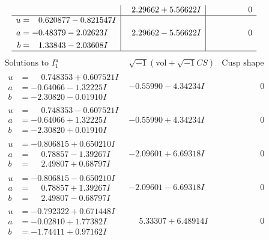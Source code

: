 \documentclass[1p]{elsarticle_modified}
\theoremstyle{definition}
\newcommand{\I}{\sqrt{-1}}
\begin{document}
$$\begin{array}{c|c|c}
 & \phantom{-}2.29662 + 5.56622 I & \phantom{-0.000000 } 0 \\ \hline\begin{aligned}
u &= \phantom{-}0.620877 - 0.821547 I \\
a &= -0.48379 - 2.02623 I \\
b &= \phantom{-}1.33843 - 2.03608 I\end{aligned}
 & \phantom{-}2.29662 - 5.56622 I & \phantom{-0.000000 } 0\\
 \hline 
 \end{array}$$\newpage$$\begin{array}{c|c|c}  
\text{Solutions to }I^u_{1}& \I (\text{vol} + \sqrt{-1}CS) & \text{Cusp shape}\\
 \hline 
\begin{aligned}
u &= \phantom{-}0.748353 + 0.607521 I \\
a &= -0.64066 - 1.32225 I \\
b &= -2.30820 - 0.01910 I\end{aligned}
 & -0.55990 - 4.34234 I & \phantom{-0.000000 } 0 \\ \hline\begin{aligned}
u &= \phantom{-}0.748353 - 0.607521 I \\
a &= -0.64066 + 1.32225 I \\
b &= -2.30820 + 0.01910 I\end{aligned}
 & -0.55990 + 4.34234 I & \phantom{-0.000000 } 0 \\ \hline\begin{aligned}
u &= -0.806815 + 0.650210 I \\
a &= \phantom{-}0.78857 - 1.39267 I \\
b &= \phantom{-}2.49807 + 0.68797 I\end{aligned}
 & -2.09601 + 6.69318 I & \phantom{-0.000000 } 0 \\ \hline\begin{aligned}
u &= -0.806815 - 0.650210 I \\
a &= \phantom{-}0.78857 + 1.39267 I \\
b &= \phantom{-}2.49807 - 0.68797 I\end{aligned}
 & -2.09601 - 6.69318 I & \phantom{-0.000000 } 0 \\ \hline\begin{aligned}
u &= -0.792322 + 0.671448 I \\
a &= -0.02810 + 1.77382 I \\
b &= -1.74411 + 0.97162 I\end{aligned}
 & \phantom{-}5.33307 + 6.48914 I & \phantom{-0.000000 } 0 \\ \hline\begin{aligned}

\end{aligned}
\end{array}$$
\end{document}
